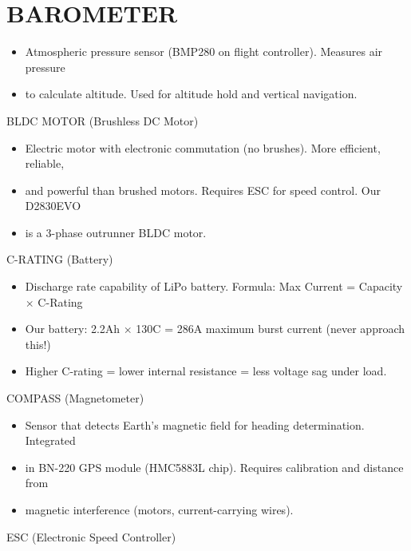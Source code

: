 \documentclass[11pt,letterpaper]{article}
\begin{document}
\section{BAROMETER}

\begin{itemize}
  \item Atmospheric pressure sensor (BMP280 on flight controller). Measures air pressure
  \item to calculate altitude. Used for altitude hold and vertical navigation.
\end{itemize}

BLDC MOTOR (Brushless DC Motor)\par

\begin{itemize}
  \item Electric motor with electronic commutation (no brushes). More efficient, reliable,
  \item and powerful than brushed motors. Requires ESC for speed control. Our D2830EVO
  \item is a 3-phase outrunner BLDC motor.
\end{itemize}

C-RATING (Battery)\par

\begin{itemize}
  \item Discharge rate capability of LiPo battery. Formula: Max Current = Capacity $\times$ C-Rating
  \item Our battery: 2.2Ah $\times$ 130C = 286A maximum burst current (never approach this!)
  \item Higher C-rating = lower internal resistance = less voltage sag under load.
\end{itemize}

COMPASS (Magnetometer)\par

\begin{itemize}
  \item Sensor that detects Earth's magnetic field for heading determination. Integrated
  \item in BN-220 GPS module (HMC5883L chip). Requires calibration and distance from
  \item magnetic interference (motors, current-carrying wires).
\end{itemize}

ESC (Electronic Speed Controller)\par
\end{document}
